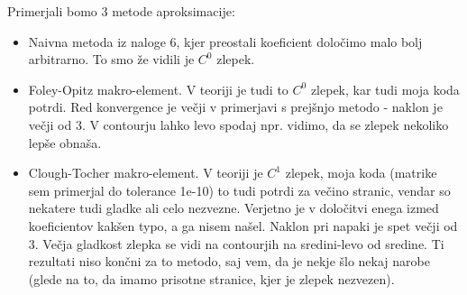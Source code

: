 \documentclass{article}
\begin{document}
Primerjali bomo 3 metode aproksimacije:
\begin{itemize}
\item Naivna metoda iz naloge 6, kjer preostali koeficient določimo malo bolj arbitrarno. To smo že vidili je $C^0$ zlepek.
\item Foley-Opitz makro-element. V teoriji je tudi to $C^0$ zlepek, kar tudi moja koda potrdi. Red konvergence je večji v primerjavi s prejšnjo metodo - naklon je večji od $3$. V contourju lahko levo spodaj npr. vidimo, da se zlepek nekoliko lepše obnaša.
\item Clough-Tocher makro-element. V teoriji je $C^1$ zlepek, moja koda (matrike sem primerjal do tolerance 1e-10) to tudi potrdi za večino stranic, vendar so nekatere tudi gladke ali celo nezvezne. Verjetno je v določitvi enega izmed koeficientov kakšen typo, a ga nisem našel. Naklon pri napaki je spet večji od $3$. Večja gladkost zlepka se vidi na contourjih na sredini-levo od sredine. Ti rezultati niso končni za to metodo, saj vem, da je nekje šlo nekaj narobe (glede na to, da imamo prisotne stranice, kjer je zlepek nezvezen).
\end{itemize}
\end{document}

